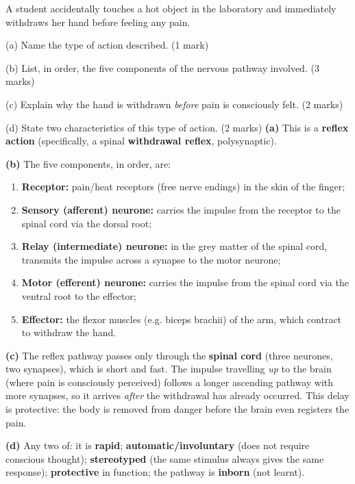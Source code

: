 \documentclass[11pt]{article}
\begin{document}
\begin{exoresolu}
A student accidentally touches a hot object in the laboratory and immediately withdraws her hand before feeling any pain.\par
(a) Name the type of action described. \hfill (1 mark)\par
(b) List, in order, the five components of the nervous pathway involved. \hfill (3 marks)\par
(c) Explain why the hand is withdrawn \emph{before} pain is consciously felt. \hfill (2 marks)\par
(d) State two characteristics of this type of action. \hfill (2 marks)
\tcblower
\textbf{(a)} This is a \textbf{reflex action} (specifically, a spinal \textbf{withdrawal reflex}, polysynaptic).\par
\textbf{(b)} The five components, in order, are:
\begin{enumerate}
\item \textbf{Receptor:} pain/heat receptors (free nerve endings) in the skin of the finger;
\item \textbf{Sensory (afferent) neurone:} carries the impulse from the receptor to the spinal cord via the dorsal root;
\item \textbf{Relay (intermediate) neurone:} in the grey matter of the spinal cord, transmits the impulse across a synapse to the motor neurone;
\item \textbf{Motor (efferent) neurone:} carries the impulse from the spinal cord via the ventral root to the effector;
\item \textbf{Effector:} the flexor muscles (e.g. biceps brachii) of the arm, which contract to withdraw the hand.
\end{enumerate}
\textbf{(c)} The reflex pathway passes only through the \textbf{spinal cord} (three neurones, two synapses), which is short and fast. The impulse travelling \emph{up} to the brain (where pain is consciously perceived) follows a longer ascending pathway with more synapses, so it arrives \emph{after} the withdrawal has already occurred. This delay is protective: the body is removed from danger before the brain even registers the pain.\par
\textbf{(d)} Any two of: it is \textbf{rapid}; \textbf{automatic/involuntary} (does not require conscious thought); \textbf{stereotyped} (the same stimulus always gives the same response); \textbf{protective} in function; the pathway is \textbf{inborn} (not learnt).
\end{exoresolu}
\end{document}
